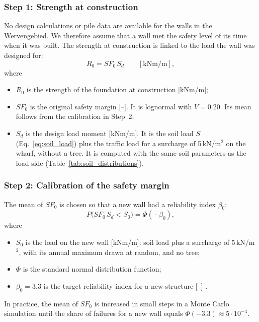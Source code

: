 \subsubsection*{Step 1: Strength at construction}
No design calculations or pile data are available for the walls in the
Wervengebied. We therefore assume that a wall met the safety level of its
time when it was built. The strength at construction is linked to the load
the wall was designed for:
\begin{equation}
  R_0 = SF_0\,S_d \qquad [\mathrm{kNm/m}], \label{eq:strength_initial}
\end{equation}
where
\begin{itemize}
  \item $R_0$ is the strength of the foundation at construction [kNm/m];
  \item $SF_0$ is the original safety margin [--]. It is lognormal with
        $V = 0.20$. Its mean follows from the calibration in Step~2;
  \item $S_d$ is the design load moment [kNm/m]. It is the soil load
        $S$ (Eq.~\ref{eq:soil_load}) plus the traffic load for a
        surcharge of 5\,kN/m$^2$ on the wharf, without a tree. It is
        computed with the same soil parameters as the load side
        (Table~\ref{tab:soil_distributions}).
\end{itemize}

\subsubsection*{Step 2: Calibration of the safety margin}
The mean of $SF_0$ is chosen so that a new wall had a reliability index
$\beta_0$:
\begin{equation}
  P\bigl(SF_0\,S_d < S_0\bigr) = \Phi(-\beta_0), \label{eq:strength_calibration}
\end{equation}
where
\begin{itemize}
  \item $S_0$ is the load on the new wall [kNm/m]: soil load plus a
        surcharge of 5\,kN/m$^2$, with its annual maximum drawn at random,
        and no tree;
  \item $\Phi$ is the standard normal distribution function;
  \item $\beta_0 = 3.3$ is the target reliability index for a new structure
        [--] \parencite{nen_en1990}.
\end{itemize}
In practice, the mean of $SF_0$ is increased in small steps in a Monte Carlo
simulation until the share of failures for a new wall equals
$\Phi(-3.3) \approx 5\cdot10^{-4}$.

